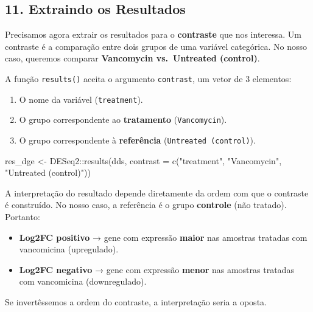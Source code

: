 \documentclass[
  letterpaper,
  DIV=11,
  numbers=noendperiod]{scrreprt}
\newenvironment{Shaded}{\begin{snugshade}}{\end{snugshade}}
\newcommand{\AttributeTok}[1]{\textcolor[rgb]{0.40,0.45,0.13}{#1}}
\newcommand{\FunctionTok}[1]{\textcolor[rgb]{0.28,0.35,0.67}{#1}}
\newcommand{\NormalTok}[1]{\textcolor[rgb]{0.00,0.23,0.31}{#1}}
\newcommand{\OtherTok}[1]{\textcolor[rgb]{0.00,0.23,0.31}{#1}}
\newcommand{\SpecialCharTok}[1]{\textcolor[rgb]{0.37,0.37,0.37}{#1}}
\newcommand{\StringTok}[1]{\textcolor[rgb]{0.13,0.47,0.30}{#1}}
\providecommand{\tightlist}{%
  \setlength{\itemsep}{0pt}\setlength{\parskip}{0pt}}
\begin{document}
\subsection{11. Extraindo os Resultados}\label{extraindo-os-resultados}

Precisamos agora extrair os resultados para o \textbf{contraste} que nos
interessa. Um contraste é a comparação entre dois grupos de uma variável
categórica. No nosso caso, queremos comparar \textbf{Vancomycin
vs.~Untreated (control)}.

A função \texttt{results()} aceita o argumento \texttt{contrast}, um
vetor de 3 elementos:

\begin{enumerate}
\def\labelenumi{\arabic{enumi}.}
\tightlist
\item
  O nome da variável (\texttt{treatment}).
\item
  O grupo correspondente ao \textbf{tratamento} (\texttt{Vancomycin}).
\item
  O grupo correspondente à \textbf{referência}
  (\texttt{Untreated\ (control)}).
\end{enumerate}

\begin{Shaded}
\begin{Highlighting}[]
\NormalTok{res\_dge }\OtherTok{\textless{}{-}}\NormalTok{ DESeq2}\SpecialCharTok{::}\FunctionTok{results}\NormalTok{(dds, }
                           \AttributeTok{contrast =} \FunctionTok{c}\NormalTok{(}\StringTok{"treatment"}\NormalTok{, }\StringTok{"Vancomycin"}\NormalTok{, }\StringTok{"Untreated (control)"}\NormalTok{))}
\end{Highlighting}
\end{Shaded}

\begin{tcolorbox}[enhanced jigsaw, arc=.35mm, colframe=quarto-callout-important-color-frame, breakable, bottomrule=.15mm, colback=white, left=2mm, titlerule=0mm, opacityback=0, title=\textcolor{quarto-callout-important-color}{\faExclamation}\hspace{0.5em}{A Ordem do Contraste Importa!}, leftrule=.75mm, colbacktitle=quarto-callout-important-color!10!white, bottomtitle=1mm, toprule=.15mm, toptitle=1mm, rightrule=.15mm, opacitybacktitle=0.6, coltitle=black]

A interpretação do resultado depende diretamente da ordem com que o
contraste é construído. No nosso caso, a referência é o grupo
\textbf{controle} (não tratado). Portanto:

\begin{itemize}
\tightlist
\item
  \textbf{Log2FC positivo} → gene com expressão \textbf{maior} nas
  amostras tratadas com vancomicina (upregulado).
\item
  \textbf{Log2FC negativo} → gene com expressão \textbf{menor} nas
  amostras tratadas com vancomicina (downregulado).
\end{itemize}

Se invertêssemos a ordem do contraste, a interpretação seria a oposta.

\end{tcolorbox}
\end{document}
